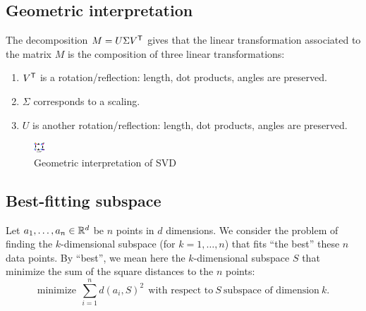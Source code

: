\documentclass[11pt,nocut]{article}
\begin{document}
\subsection{Geometric interpretation}

The decomposition $M = U \Sigma V^{{\sf T}}$ gives that the linear transformation associated to the matrix $M$ is the composition of three linear transformations:
\begin{enumerate}
	\item $V^{{\sf T}}$ is a rotation/reflection: length, dot products, angles are preserved.
	\item $\Sigma$ corresponds to a scaling.
	\item $U$ is another rotation/reflection: length, dot products, angles are preserved.
\end{enumerate}

\begin{figure}[H]
	\begin{center}
	\includegraphics[width = 0.5\linewidth]{figures/svd.pdf}
	\end{center}
	\caption{Geometric interpretation of SVD}
	\label{fig:svd}
\end{figure}




\subsection{Best-fitting subspace}
Let $a_1, \dots, a_n \in \mathbb{R}^d$ be $n$ points in $d$ dimensions.
We consider the problem of finding the $k$-dimensional subspace (for $k = 1, \dots, n$) that fits ``the best'' these $n$ data points. By ``best'', we mean here the $k$-dimensional subspace $S$ that minimize the sum of the square distances to the $n$ points:
\begin{equation}\label{eq:fit}
	\text{minimize} \ \ \sum_{i=1}^n d(a_i, S)^2 \ \ \text{with respect to} \ S \ \text{subspace of dimension} \ k.
\end{equation}
\end{document}
